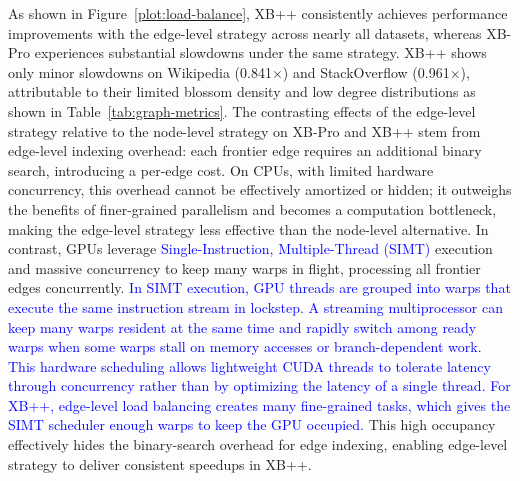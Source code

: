 As shown in Figure~\ref{plot:load-balance}, XB++ consistently achieves performance improvements with the edge-level strategy across nearly all datasets, whereas XB-Pro experiences substantial slowdowns under the same strategy. 
XB++ shows only minor slowdowns on Wikipedia (0.841$\times$) and StackOverflow (0.961$\times$), 
attributable to their limited blossom density and low degree distributions as shown in Table~\ref{tab:graph-metrics}.
The contrasting effects of the edge-level strategy relative to the node-level strategy on XB-Pro and XB++ stem from edge-level indexing overhead: each frontier edge requires an additional binary search, introducing a per-edge cost.
On CPUs, with limited hardware concurrency, this overhead cannot be effectively amortized or hidden; it outweighs the benefits of finer-grained parallelism and becomes a computation bottleneck, making the edge-level strategy less effective than the node-level alternative.
In contrast, GPUs leverage \label{para:first-simt}\textcolor{blue}{Single-Instruction, Multiple-Thread (SIMT)} execution and massive concurrency to keep many warps in flight, processing all frontier edges concurrently.
\label{para:smit_execution}
\textcolor{blue}{In SIMT execution, GPU threads are grouped into warps that execute the same instruction stream in lockstep. A streaming multiprocessor can keep many warps resident at the same time and rapidly switch among ready warps when some warps stall on memory accesses or branch-dependent work. This hardware scheduling allows lightweight CUDA threads to tolerate latency through concurrency rather than by optimizing the latency of a single thread. For XB++, edge-level load balancing creates many fine-grained tasks, which gives the SIMT scheduler enough warps to keep the GPU occupied.
}
This high occupancy effectively hides the binary-search overhead for edge indexing, enabling edge-level strategy to deliver consistent speedups in XB++.

